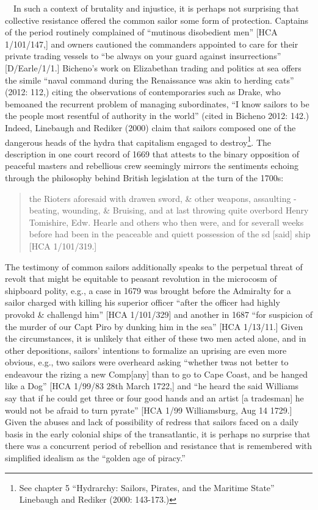 \begin{styleStandard}
\ \ In such a context of brutality and injustice, it is perhaps not surprising that collective resistance offered the common sailor some form of protection. Captains of the period routinely complained of “mutinous disobedient men” [HCA 1/101/147,] and owners cautioned the commanders appointed to care for their private trading vessels to “be always on your guard against insurrections” [D/Earle/1/1.] Bicheno’s work on Elizabethan trading and politics at sea offers the simile “naval command during the Renaissance was akin to herding cats” (2012: 112,) citing the observations of contemporaries such as Drake, who bemoaned the recurrent problem of managing subordinates, “I know sailors to be the people most resentful of authority in the world” (cited in Bicheno 2012: 142.) Indeed, Linebaugh and Rediker (2000) claim that sailors composed one of the dangerous heads of the hydra that capitalism engaged to destroy\footnote{ See chapter 5 “Hydrarchy: Sailors, Pirates, and the Maritime State” Linebaugh and Rediker (2000: 143-173.)}. The description in one court record of 1669 that attests to the binary opposition of peaceful masters and rebellious crew seemingly mirrors the sentiments echoing through the philosophy behind British legislation at the turn of the 1700s:
\end{styleStandard}


\begin{quotation}
the Rioters aforesaid with drawen sword, \& other weapons, assaulting - beating, wounding, \& Bruising, and at last throwing quite overbord Henry Tomishire, Edw. Hearle and others who then were, and for severall weeks before had been in the peaceable and quiett possession of the sd [said] ship [HCA 1/101/319.] 

\end{quotation}
\begin{styleStandard}
The testimony of common sailors additionally speaks to the perpetual threat of revolt that might be equitable to peasant revolution in the microcosm of shipboard polity, e.g., a case in 1679 was brought before the Admiralty for a sailor charged with killing his superior officer “after the officer had highly provokd \& challengd him” [HCA 1/101/329] and another in 1687 “for suspicion of the murder of our Capt Piro by dunking him in the sea” [HCA 1/13/11.] Given the circumstances, it is unlikely that either of these two men acted alone, and in other depositions, sailors’ intentions to formalize an uprising are even more obvious, e.g., two sailors were overheard asking “whether twas not better to endeavour the rizing a new Comp[any] than to go to Cape Coast, and be hanged like a Dog” [HCA 1/99/83 28th March 1722,] and “he heard the said Williams say that if he could get three or four good hands and an artist [a tradesman] he would not be afraid to turn pyrate” [HCA 1/99 Williamsburg, Aug 14 1729.] Given the abuses and lack of possibility of redress that sailors faced on a daily basis in the early colonial ships of the transatlantic, it is perhaps no surprise that there was a concurrent period of rebellion and resistance that is remembered with simplified idealism as the “golden age of piracy.”
\end{styleStandard}


